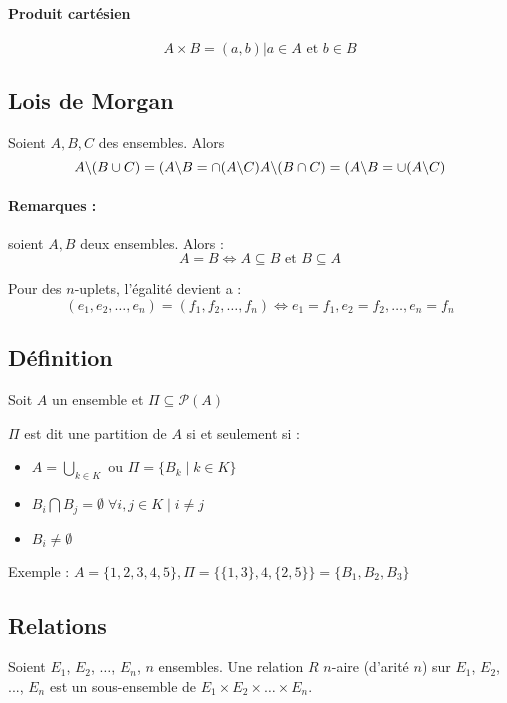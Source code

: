 \documentclass[12pt, a4paper]{report}
\begin{document}
\paragraph{Produit cartésien}
\[ A \times B = {(a, b) | a \in A \text{ et } b \in B} \]

\subsection{Lois de Morgan}
Soient $A, B, C$ des ensembles. Alors
\[
A\backslash(B \cup C) = (A\backslash B=\cap(A\backslash C) \\
A\backslash(B \cap C) = (A\backslash B=\cup(A\backslash C)
\]

\paragraph{Remarques :} soient $A, B$ deux ensembles. Alors :
\[
A=B \Leftrightarrow A\subseteq B \text{ et } B\subseteq A
\]

Pour des $n$-uplets, l'égalité devient a :
\[
(e_1,e_2,\dots,e_n)=(f_1,f_2,\dots,f_n)\Leftrightarrow e_1=f_1,e_2=f_2,
\dots,e_n=f_n
\]

\subsection{Définition}


Soit $A$ un ensemble et $\Pi \subseteq \mathcal{P}(A)$

$\Pi$ est dit une partition de $A$ si et seulement si :
\begin{itemize}
\item $A = \bigcup_{k\in K} \text{ ou }\Pi=\{B_k \mid k\in K\}$
\item $B_i\bigcap B_j = \emptyset \; \forall i, j\in K \mid i\neq j$
\item $B_i \neq \emptyset$
\end{itemize}

Exemple : $A=\{1,2,3,4,5\}, \Pi=\{\{1,3\},4,\{2,5\}\} = \{B_1,B_2,B_3\}$

\subsection{Relations}

Soient $E_1$, $E_2$, $\dots$, $E_n$, $n$ ensembles. Une relation $R$
$n$-aire (d'arité $n$) sur $E_1$, $E_2$, ..., $E_n$ est un
sous-ensemble de $E_1 \times E_2 \times \dots \times E_n$.
\end{document}
